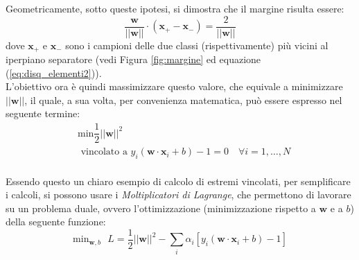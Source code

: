 Geometricamente, sotto queste ipotesi, si dimostra che il margine risulta essere: 
\begin{equation}
\label{eq:margine}
\dfrac{\mathbf{w}}{\vert\vert\mathbf{w}\vert\vert}\cdot\left (\mathbf{x}_+-\mathbf{x}_-\right )=\dfrac{2}{\vert\vert\mathbf{w}\vert\vert}
\end{equation}
dove $\mathbf{x}_+$ e $\mathbf{x}_-$ sono i campioni delle due classi (rispettivamente) più vicini al iperpiano separatore (vedi Figura \ref{fig:margine} ed equazione (\ref{eq:disq_elementi2})).
\\
L'obiettivo ora è quindi massimizzare questo valore, che equivale a minimizzare $\vert\vert\mathbf{w}\vert\vert$, il quale, a sua volta, per convenienza matematica, può essere espresso nel seguente termine:
\begin{eqnarray}\nonumber
\label{eq:problema_di_minimizzazione}
&\text{min}\dfrac{1}{2}\vert\vert\mathbf{w}\vert\vert^2\\
&\text{ vincolato a }y_i\left (\mathbf{w}\cdot\mathbf{x}_i+b\right )-1=0 \quad \forall i=1,\ldots,N
\end{eqnarray}
\\
Essendo questo un chiaro esempio di calcolo di estremi vincolati, per semplificare i calcoli, si possono usare i \textit{Moltiplicatori di Lagrange}, che permettono di lavorare su un problema duale, ovvero l'ottimizzazione (minimizzazione rispetto a $\mathbf{w}$ e a $b$) della seguente funzione:
\begin{equation}
\label{eq:lagrangiana}
\text{min}_{\mathbf{w},b}\text{ }L=\dfrac{1}{2}\vert\vert\mathbf{w}\vert\vert^2-\sum_i\alpha_i\left [y_i\left (\mathbf{w}\cdot\mathbf{x}_i+b\right )-1\right ]
\end{equation}

